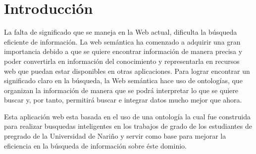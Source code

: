 
\chapter{Introducción}

La falta de significado que se maneja en la Web actual, dificulta la 
búsqueda eficiente de información. La web semántica ha comenzado a adquirir una
gran importancia debido a que se quiere encontrar información de manera precisa  y 
poder convertirla en información del conocimiento y representarla en recursos web que
puedan estar disponibles en otras aplicaciones. Para lograr encontrar un significado
claro en la búsqueda,  la Web semántica hace uso de ontologías, que organizan la 
información de manera que se podrá interpretar lo que se quiere buscar y, por tanto, 
permitirá buscar e integrar datos mucho mejor que ahora.

Esta aplicación web esta basada en el uso de una ontología la cual fue construida para
realizar busquedas inteligentes en los trabajos de grado de los estudiantes de pregrado de
la Universidad de Nariño y servir como base para  mejorar la eficiencia 
en la búsqueda de información sobre éste dominio.